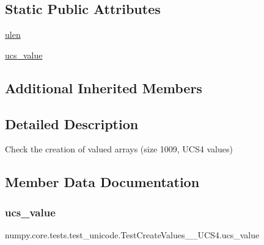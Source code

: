 \subsection*{Static Public Attributes}
\begin{DoxyCompactItemize}
\item 
\hyperlink{classnumpy_1_1core_1_1tests_1_1test__unicode_1_1TestCreateValues__1009__UCS4_a77230fdc35d9a58b1153175f567f828e}{ulen}
\item 
\hyperlink{classnumpy_1_1core_1_1tests_1_1test__unicode_1_1TestCreateValues__1009__UCS4_ab68005787d8159eceebb078d36cfac57}{ucs\+\_\+value}
\end{DoxyCompactItemize}
\subsection*{Additional Inherited Members}


\subsection{Detailed Description}
\begin{DoxyVerb}Check the creation of valued arrays (size 1009, UCS4 values)\end{DoxyVerb}
 

\subsection{Member Data Documentation}
\mbox{\label{classnumpy_1_1core_1_1tests_1_1test__unicode_1_1TestCreateValues__1009__UCS4_ab68005787d8159eceebb078d36cfac57}} 
\subsubsection{\texorpdfstring{ucs\+\_\+value}{ucs\_value}}
{\footnotesize\ttfamily numpy.\+core.\+tests.\+test\+\_\+unicode.\+Test\+Create\+Values\+\_\+\_\+\+U\+C\+S4.\+ucs\+\_\+value\hspace{0.3cm}{\ttfamily [static]}}

